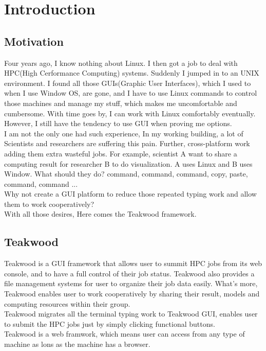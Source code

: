 \chapter{Introduction}

\section{Motivation}
Four years ago, I know nothing about Linux. I then got a job to deal with HPC(High Cerformance Computing) systems. Suddenly I jumped in to an UNIX environment. I found all those GUIs(Graphic User Interfaces), which I used to when I use Window OS, are gone, and I have to use Linux commands to control those machines and manage my stuff, which makes me uncomfortable and cumbersome. With time goes by, I can work with Linux comfortably eventually. However, I still have the tendency to use GUI when proving me options.\\I am not the only one had such experience, In my working building, a lot of Scientists and researchers are suffering this pain. Further, cross-platform work adding them extra wasteful jobs. For example, scientist A want to share a computing result for researcher B to do visualization. A uses Linux and B uses Window. What should they do? command, command, command, copy, paste, command, command ...\\Why not create a GUI platform to reduce those repeated typing work and allow them to work cooperatively?\\With all those desires, Here comes the Teakwood framework.

\section{Teakwood}
Teakwood is a GUI framework that allows user to summit HPC jobs from its web console, and to have a full control of their job status. Teakwood also provides a file management systems for user to organize their job data easily. What's more, Teakwood enables user to work cooperatively by sharing their result, models and computing resources within their group. \\Teakwood migrates all the terminal typing work to Teakwood GUI, enables user to submit the HPC jobs just by simply clicking functional buttons.\\Teakwood is a web framwork, which means user can access from any type of machine as lons as the machine has a browser.

